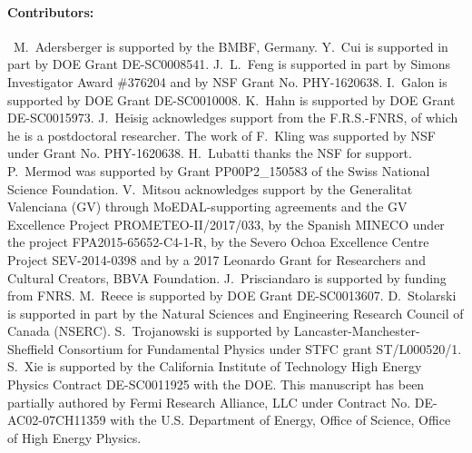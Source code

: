 \paragraph{Contributors:}~M.~Adersberger is supported by the BMBF, Germany. Y.~Cui is supported in part by DOE Grant DE-SC0008541. J.~L.~Feng is supported in part by Simons Investigator Award \#376204 and by NSF Grant No. PHY-1620638. I.~Galon is supported by DOE Grant DE-SC0010008. K.~Hahn is supported by DOE Grant DE-SC0015973. J.~Heisig acknowledges support from the F.R.S.-FNRS, of which he is a postdoctoral researcher. The work of F.~Kling was supported by NSF under Grant No. PHY-1620638. H.~Lubatti thanks the NSF for support. P.~Mermod was supported by Grant PP00P2\_150583 of the Swiss National Science Foundation. V.~Mitsou acknowledges support by the Generalitat Valenciana (GV) through MoEDAL-supporting agreements and the GV Excellence Project PROMETEO-II/2017/033, by the Spanish MINECO under the project FPA2015-65652-C4-1-R, by the Severo Ochoa Excellence Centre Project SEV-2014-0398 and by a 2017 Leonardo Grant for Researchers and Cultural Creators, BBVA Foundation. J.~Prisciandaro is supported by funding from FNRS. M.~Reece is supported by DOE Grant DE-SC0013607. D.~Stolarski is supported in part by the Natural Sciences and Engineering Research Council of Canada (NSERC). S.~Trojanowski is supported by Lancaster-Manchester-Sheffield Consortium for Fundamental Physics under STFC grant ST/L000520/1. S.~Xie is supported by the California Institute of Technology High Energy Physics Contract DE-SC0011925 with the DOE. This manuscript has been partially authored by Fermi Research Alliance, LLC under Contract No. DE-AC02-07CH11359 with the U.S. Department of Energy, Office of Science, Office of High Energy Physics.\\



